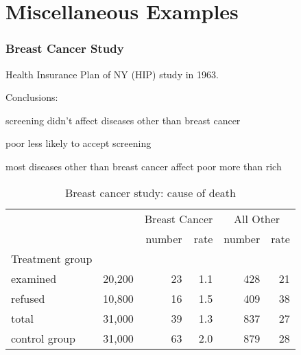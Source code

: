 \documentclass[landscape]{exam}
\begin{document}
  \part{Miscellaneous Examples}
  \section{Breast Cancer Study}
  Health Insurance Plan of NY (HIP) study in 1963.

  Conclusions:
  \begin{itemize*}
    \item screening didn't affect diseases other than breast cancer
    \item poor less likely to accept screening
    \item most diseases other than breast cancer affect poor more than rich
  \end{itemize*}

  \begin{table}
    \centering
    \begin{tabular}{lrrrrr}
      & & \multicolumn{2}{c}{Breast Cancer} & \multicolumn{2}{c}{All Other} \\
                               \cmidrule(r){3-4} \cmidrule(r){5-6}    
                      &        & number & rate & number & rate \\
      Treatment group \\
      examined        & 20,200 & 23     & 1.1  & 428    & 21 \\
      refused         & 10,800 & 16     & 1.5  & 409    & 38 \\
      total           & 31,000 & 39     & 1.3  & 837    & 27 \\
    \midrule
      control group   & 31,000 & 63     & 2.0  & 879    & 28 \\
    \end{tabular}
    \caption{Breast cancer study: cause of death}
    \label{tab:breast.cancer}
  \end{table}
\end{document}
